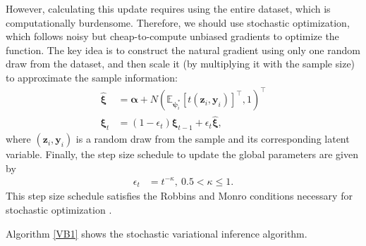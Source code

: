 However, calculating this update requires using the entire dataset, which is computationally burdensome. Therefore, we should use stochastic optimization, which follows noisy but cheap-to-compute unbiased gradients to optimize the function. The key idea is to construct the natural gradient using only one random draw from the dataset, and then scale it (by multiplying it with the sample size) to approximate the sample information:
\begin{align*}
	\hat{\boldsymbol{\xi}}&=\boldsymbol{\alpha}+N(\mathbb{E}_{\boldsymbol{\psi}_i^*}[t(\boldsymbol{z}_i,\boldsymbol{y}_i)]^{\top},1)^{\top}\\
	\boldsymbol{\xi}_t&=(1-\epsilon_t)\boldsymbol{\xi}_{t-1}+\epsilon_t\hat{\boldsymbol{\xi}},
\end{align*}
where $(\boldsymbol{z}_i, \boldsymbol{y}_i)$ is a random draw from the sample and its corresponding latent variable. Finally, the step size schedule to update the global parameters are given by
\begin{align*}
	\epsilon_t&=t^{-\kappa}, \ 0.5 < \kappa \leq 1.
\end{align*} 
This step size schedule satisfies the Robbins and Monro conditions necessary for stochastic optimization \cite{robbins1951stochastic}.

Algorithm \ref{VB1} shows the stochastic variational inference algorithm.

